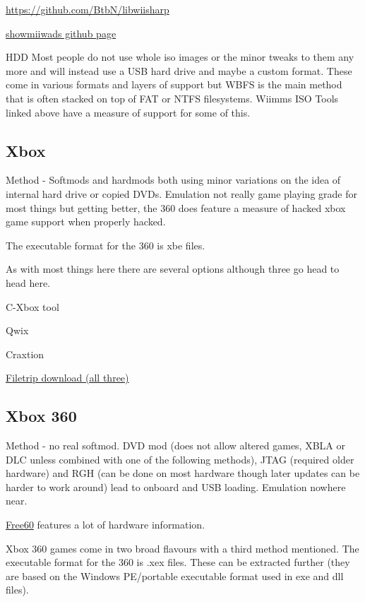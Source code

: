 \documentclass[
]{book}
\begin{document}
\href{http://libwiisharp\%20github\%20page}{https://github.com/BtbN/libwiisharp}

\href{https://github.com/Plombo/showmiiwads}{showmiiwads github page}

HDD Most people do not use whole iso images or the minor tweaks to them any more and will instead use a USB hard drive and maybe a custom format. These come in various formats and layers of support but WBFS is the main method that is often stacked on top of FAT or NTFS filesystems. Wiimms ISO Tools linked above have a measure of support for some of this.

\hypertarget{xbox}{%
\subsection{Xbox}\label{xbox}}

Method - Softmods and hardmods both using minor variations on the idea of internal hard drive or copied DVDs. Emulation not really game playing grade for most things but getting better, the 360 does feature a measure of hacked xbox game support when properly hacked.

The executable format for the 360 is xbe files.

As with most things here there are several options although three go head to head here.

C-Xbox tool

Qwix

Craxtion

\href{http://filetrip.net/oldies-downloads/xbox/iso-hacks-tools/}{Filetrip download (all three)}

\hypertarget{xbox-360}{%
\subsection{Xbox 360}\label{xbox-360}}

Method - no real softmod. DVD mod (does not allow altered games, XBLA or DLC unless combined with one of the following methods), JTAG (required older hardware) and RGH (can be done on most hardware though later updates can be harder to work around) lead to onboard and USB loading. Emulation nowhere near.

\href{http://free60.org/Main_Page}{Free60} features a lot of hardware information.

Xbox 360 games come in two broad flavours with a third method mentioned. The executable format for the 360 is .xex files. These can be extracted further (they are based on the Windows PE/portable executable format used in exe and dll files).
\end{document}
